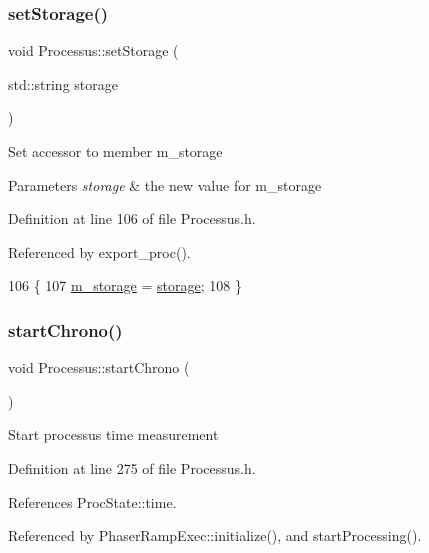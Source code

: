 \subsubsection{\texorpdfstring{set\+Storage()}{setStorage()}}
{\footnotesize\ttfamily void Processus\+::set\+Storage (\begin{DoxyParamCaption}\item[{std\+::string}]{storage }\end{DoxyParamCaption})\hspace{0.3cm}{\ttfamily [inline]}}

Set accessor to member m\+\_\+storage 
\begin{DoxyParams}{Parameters}
{\em storage} & the new value for m\+\_\+storage \\
\hline
\end{DoxyParams}


Definition at line 106 of file Processus.\+h.



Referenced by export\+\_\+proc().


\begin{DoxyCode}
106                                       \{
107     \hyperlink{classProcessus_a132b1e71f72327e5a87f0a168c7b6325}{m\_storage} = \hyperlink{classProcessus_a33fa1a0b54a636e5cdd680669fd9ea51}{storage};
108   \}
\end{DoxyCode}
\mbox{\label{classProcessus_a5e4d34b86241fa0756e07375a14ff4b2}} 
\subsubsection{\texorpdfstring{start\+Chrono()}{startChrono()}}
{\footnotesize\ttfamily void Processus\+::start\+Chrono (\begin{DoxyParamCaption}{ }\end{DoxyParamCaption})\hspace{0.3cm}{\ttfamily [inline]}}

Start processus time measurement 

Definition at line 275 of file Processus.\+h.



References Proc\+State\+::time.



Referenced by Phaser\+Ramp\+Exec\+::initialize(), and start\+Processing().


